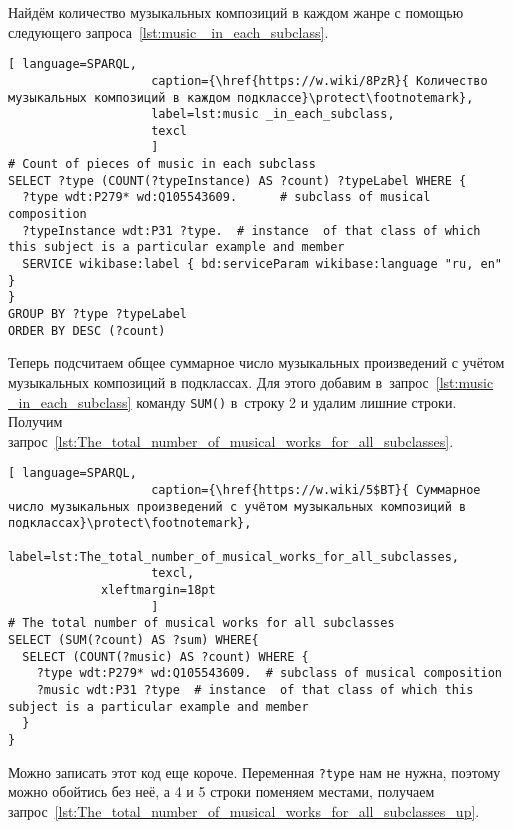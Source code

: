 Найдём количество музыкальных композиций в каждом жанре с помощью следующего запроса~\ref{lst:music _in_each_subclass}.

\begin{lstlisting}[ language=SPARQL,
                    caption={\href{https://w.wiki/8PzR}{ Количество музыкальных композиций в каждом подклассе}\protect\footnotemark},
                    label=lst:music _in_each_subclass,
                    texcl
                    ]
# Count of pieces of music in each subclass
SELECT ?type (COUNT(?typeInstance) AS ?count) ?typeLabel WHERE {
  ?type wdt:P279* wd:Q105543609.      # subclass of musical composition
  ?typeInstance wdt:P31 ?type.  # instance  of that class of which this subject is a particular example and member
  SERVICE wikibase:label { bd:serviceParam wikibase:language "ru, en" }
}
GROUP BY ?type ?typeLabel
ORDER BY DESC (?count)
\end{lstlisting}%

Теперь подсчитаем общее суммарное число музыкальных произведений с учётом музыкальных композиций в подклассах. Для этого добавим в~запрос~\ref{lst:music _in_each_subclass} команду \lstinline|SUM()| в~строку 2 и удалим лишние строки. Получим запрос~\ref{lst:The_total_number_of_musical_works_for_all_subclasses}.

\begin{lstlisting}[ language=SPARQL,
                    caption={\href{https://w.wiki/5$BT}{ Суммарное число музыкальных произведений с учётом музыкальных композиций в подклассах}\protect\footnotemark},
                    label=lst:The_total_number_of_musical_works_for_all_subclasses,
                    texcl,
	         xleftmargin=18pt
                    ]
# The total number of musical works for all subclasses 
SELECT (SUM(?count) AS ?sum) WHERE{
  SELECT (COUNT(?music) AS ?count) WHERE {
    ?type wdt:P279* wd:Q105543609.  # subclass of musical composition
    ?music wdt:P31 ?type  # instance  of that class of which this subject is a particular example and member
  }
}
\end{lstlisting}%

Можно записать этот код еще короче. Переменная \lstinline|?type| нам не нужна, поэтому можно обойтись без неё, а 4 и 5 строки поменяем местами, получаем запрос~\ref{lst:The_total_number_of_musical_works_for_all_subclasses_up}.

